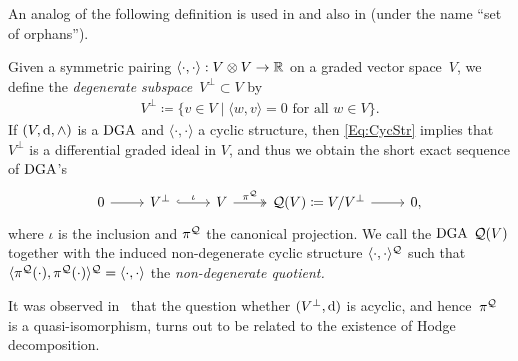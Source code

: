 \documentclass[\MainFolder/Text.tex]{subfiles}
\begin{document}
An analog of the following definition is used in \cite{Van2019} and also in \cite{Lambrechts2007} (under the name ``set of orphans''). 

\begin{Definition}\label{Def:NonDegQ}
Given a symmetric pairing $\langle\cdot,\cdot\rangle: V\otimes V\rightarrow\mathbb{R}$ on a graded vector space~$V$, we define the \emph{degenerate subspace}~$V^\perp\subset V$ by 
\begin{align*}
V^\perp\coloneqq \{ v\in V \mid \langle w,v \rangle = 0\text{ for all }w\in V\}.
\end{align*}
If $(V,\mathrm{d},\wedge)$ is a $\mathrm{DGA}$ and $\langle\cdot,\cdot\rangle$ a cyclic structure, then \eqref{Eq:CycStr} implies that $V^\perp$ is a differential graded ideal in $V$, and thus we obtain the short exact sequence of $\mathrm{DGA}$'s
\begin{equation}\label{Eq:ImportantSES}
\begin{tikzcd}
0 \arrow{r} & V^\perp \arrow[hook]{r}{\iota} & V \arrow[two heads]{r}{\pi^\VansQuotient} & \VansQuotient(V) \coloneqq V / V^\perp \arrow{r} & 0,
\end{tikzcd}
\end{equation}
where $\iota$ is the inclusion and $\pi^{\mathcal{Q}}$ the canonical projection. We call the $\mathrm{DGA}$ $\mathcal{Q}(V)$ together with the induced non-degenerate cyclic structure $\langle\cdot,\cdot\rangle^{\mathcal{Q}}$ such that $\langle\pi^{\mathcal{Q}}(\cdot),\pi^{\mathcal{Q}}(\cdot)\rangle^{\mathcal{Q}} = \langle\cdot,\cdot\rangle$ the \emph{non-degenerate quotient.}
\end{Definition}

It was observed in~\cite{Van2019} that the question whether $(V^\perp,\mathrm{d})$ is acyclic, and hence~$\pi^{\mathcal{Q}}$ is a quasi-isomorphism, turns out to be related to the existence of Hodge decomposition.
\end{document}
